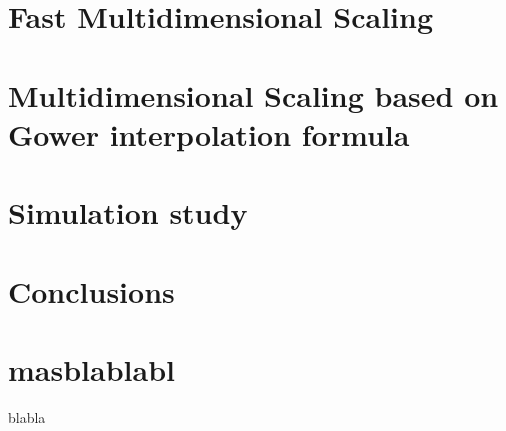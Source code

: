 \documentclass[11pt]{report}
\begin{document}
\chapter{Fast Multidimensional Scaling}


\chapter{Multidimensional Scaling based on Gower interpolation formula}

\chapter{Simulation study}


\chapter{Conclusions}

\nocite{*}




\appendix 

\chapter{masblablabl}
blabla
\end{document}
